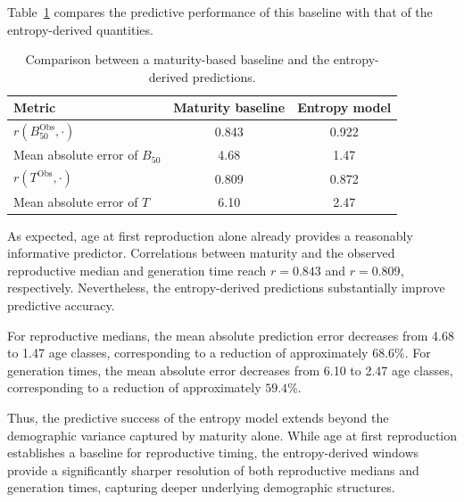 \documentclass[10pt,a4paper]{amsart}
\theoremstyle{definition}
\theoremstyle{remark}
\numberwithin{equation}{section}
\begin{document}
Table~\ref{tab:BaselineComparison} compares the predictive performance
of this baseline with that of the entropy-derived quantities.

\begin{table}[t]
	\centering
	\caption{Comparison between a maturity-based baseline and the entropy-derived predictions.}
	\label{tab:BaselineComparison}
	\begin{tabular}{lcc}
		\hline
		Metric & Maturity baseline & Entropy model \\
		\hline
		$r(B_{50}^{\mathrm{Obs}},\cdot)$ & 0.843 & 0.922 \\
		Mean absolute error of $B_{50}$ & 4.68 & 1.47 \\
		$r(T^{\mathrm{Obs}},\cdot)$ & 0.809 & 0.872 \\
		Mean absolute error of $T$ & 6.10 & 2.47 \\
		\hline
	\end{tabular}
\end{table}

As expected, age at first reproduction alone already provides a
reasonably informative predictor. Correlations between maturity and
the observed reproductive median and generation time reach
$r=0.843$ and $r=0.809$, respectively. Nevertheless, the
entropy-derived predictions substantially improve predictive accuracy.

For reproductive medians, the mean absolute prediction error decreases
from 4.68 to 1.47 age classes, corresponding to a reduction of
approximately $68.6\%$. For generation times, the mean absolute error
decreases from 6.10 to 2.47 age classes, corresponding to a reduction
of approximately $59.4\%$.



Thus, the predictive success of the entropy model extends beyond the demographic variance captured by maturity alone. While age at first reproduction establishes a baseline for reproductive timing, the entropy-derived windows provide a significantly sharper resolution of both reproductive medians and generation times, capturing deeper underlying demographic structures.



%
\end{document}
